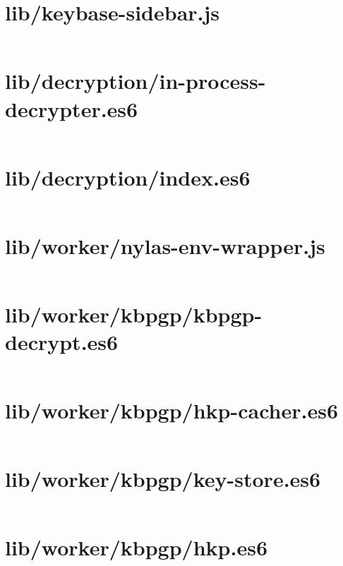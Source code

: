 \documentclass[10pt, letterpaper]{article}
\begin{document}
\section{lib/keybase-sidebar.js}
\inputminted{javascript}{/home/mbilker/.nylas/dev/packages/cypher/lib/keybase-sidebar.js}

\section{lib/decryption/in-process-decrypter.es6}
\inputminted{javascript}{/home/mbilker/.nylas/dev/packages/cypher/lib/decryption/in-process-decrypter.es6}

\section{lib/decryption/index.es6}
\inputminted{javascript}{/home/mbilker/.nylas/dev/packages/cypher/lib/decryption/index.es6}

\section{lib/worker/nylas-env-wrapper.js}
\inputminted{javascript}{/home/mbilker/.nylas/dev/packages/cypher/lib/worker/nylas-env-wrapper.js}

\section{lib/worker/kbpgp/kbpgp-decrypt.es6}
\inputminted{javascript}{/home/mbilker/.nylas/dev/packages/cypher/lib/worker/kbpgp/kbpgp-decrypt.es6}

\section{lib/worker/kbpgp/hkp-cacher.es6}
\inputminted{javascript}{/home/mbilker/.nylas/dev/packages/cypher/lib/worker/kbpgp/hkp-cacher.es6}

\section{lib/worker/kbpgp/key-store.es6}
\inputminted{javascript}{/home/mbilker/.nylas/dev/packages/cypher/lib/worker/kbpgp/key-store.es6}

\section{lib/worker/kbpgp/hkp.es6}
\inputminted{javascript}{/home/mbilker/.nylas/dev/packages/cypher/lib/worker/kbpgp/hkp.es6}
\end{document}
